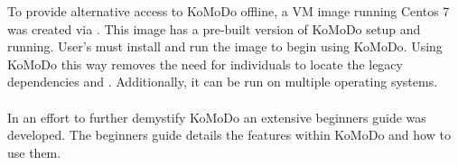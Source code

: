   To provide alternative access to KoMoDo offline, a VM image running Centos 7 was created via . This image has a pre-built version of KoMoDo setup and running. User's must install  and run the image to begin using KoMoDo. Using KoMoDo this way removes the need for individuals to locate the legacy dependencies  and . Additionally, it can be run on multiple operating systems.\\\\
  In an effort to further demystify KoMoDo an extensive beginners guide was developed. The beginners guide details the features within KoMoDo and how to use them.

